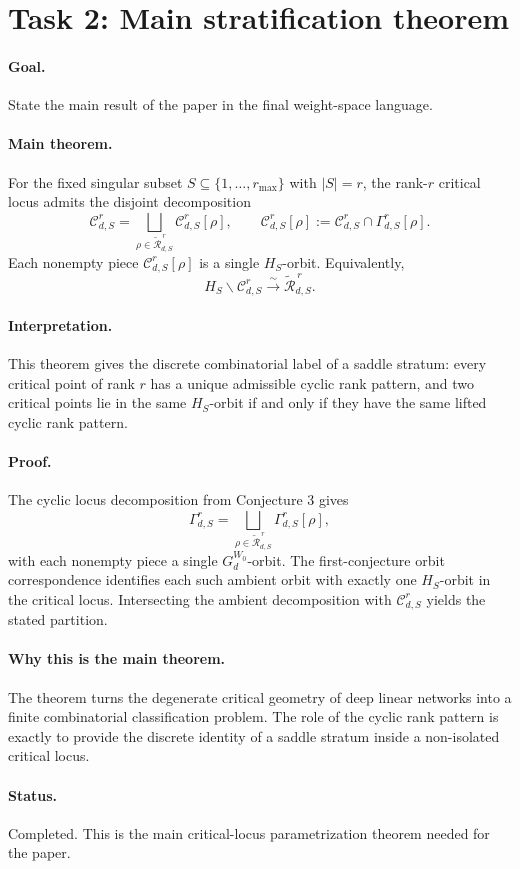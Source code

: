 \section*{Task 2: Main stratification theorem}

\paragraph{Goal.}
State the main result of the paper in the final weight-space language.

\paragraph{Main theorem.}
For the fixed singular subset \(S\subseteq \{1,\dots,r_{\max}\}\) with
\(|S|=r\), the rank-\(r\) critical locus admits the disjoint decomposition
\[
\mathcal C_{d,S}^r
=
\bigsqcup_{\rho\in \widetilde{\mathcal R}_{d,S}^{\,r}}
\mathcal C_{d,S}^r[\rho],
\qquad
\mathcal C_{d,S}^r[\rho]
:=
\mathcal C_{d,S}^r\cap \Gamma_{d,S}^r[\rho].
\]
Each nonempty piece \(\mathcal C_{d,S}^r[\rho]\) is a single \(H_S\)-orbit.
Equivalently,
\[
H_S\backslash \mathcal C_{d,S}^r
\xrightarrow{\sim}
\widetilde{\mathcal R}_{d,S}^{\,r}.
\]

\paragraph{Interpretation.}
This theorem gives the discrete combinatorial label of a saddle stratum:
every critical point of rank \(r\) has a unique admissible cyclic rank pattern,
and two critical points lie in the same \(H_S\)-orbit if and only if they have
the same lifted cyclic rank pattern.

\paragraph{Proof.}
The cyclic locus decomposition from Conjecture 3 gives
\[
\Gamma_{d,S}^r
=
\bigsqcup_{\rho\in \widetilde{\mathcal R}_{d,S}^{\,r}}
\Gamma_{d,S}^r[\rho],
\]
with each nonempty piece a single \(G_d^{W_0}\)-orbit. The first-conjecture
orbit correspondence identifies each such ambient orbit with exactly one
\(H_S\)-orbit in the critical locus. Intersecting the ambient decomposition with
\(\mathcal C_{d,S}^r\) yields the stated partition.

\paragraph{Why this is the main theorem.}
The theorem turns the degenerate critical geometry of deep linear networks into
a finite combinatorial classification problem. The role of the cyclic rank
pattern is exactly to provide the discrete identity of a saddle stratum inside a
non-isolated critical locus.

\paragraph{Status.}
Completed. This is the main critical-locus parametrization theorem needed for
the paper.
